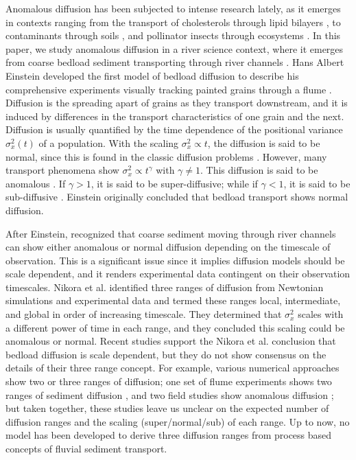 \documentclass[draft,grl]{agujournal2018}
\begin{document}
Anomalous diffusion has been subjected to intense research lately, as it emerges in contexts ranging from the transport of cholesterols through lipid bilayers \citep{Jeon2012,Molina-Garcia2018}, to contaminants through soils \citep{Berkowitz2006,Yang2019}, and pollinator insects through ecosystems \citep{Reynolds2009,Vallaeys2017}.
In this paper, we study anomalous diffusion in a river science context, where it emerges from coarse bedload sediment transporting through river channels \citep{Bradley2017,Martin2012,Ganti2010}.
Hans Albert Einstein developed the first model of bedload diffusion to describe his comprehensive experiments visually tracking painted grains through a flume \citep{Ettema2004,Einstein1937}.
Diffusion is the spreading apart of grains as they transport downstream, and it is induced by differences in the transport characteristics of one grain and the next.
Diffusion is usually quantified by the time dependence of the positional variance $\sigma_x^2(t)$ of a population.
With the scaling $\sigma_x^2 \propto t$, the diffusion is said to be normal, since this is found in the classic diffusion problems \citep[e.g.,][]{Einstein1905,Taylor1920}.
However, many transport phenomena show $\sigma_x^2 \propto t^\gamma$ with $\gamma \neq 1$.
This diffusion is said to be anomalous \citep{Sokolov2012}. 
If $\gamma>1$, it is said to be super-diffusive; while if $\gamma <1$, it is said to be sub-diffusive \citep{Metzler2000}.
Einstein originally concluded that bedload transport shows normal diffusion.

After Einstein, \citet{Nikora2001a,Nikora2002} recognized that coarse sediment moving through river channels can show either anomalous or normal diffusion depending on the timescale of observation.
This is a significant issue since it implies diffusion models should be scale dependent, and it renders experimental data contingent on their observation timescales.
Nikora et al. identified three ranges of diffusion from Newtonian simulations and experimental data and termed these ranges local, intermediate, and global in order of increasing timescale.
They determined that $\sigma_x^2$ scales with a different power of time in each range, and they concluded this scaling could be anomalous or normal.
Recent studies support the Nikora et al. conclusion that bedload diffusion is scale dependent, but they do not show consensus on the details of their three range concept.
For example, various numerical approaches show two \citep[e.g.,][]{Fan2016} or three \citep[e.g.,][]{Bialik2012,Zhang2012} ranges of diffusion; one set of flume experiments shows two ranges of sediment diffusion \citep{Martin2012}, and two field studies show anomalous diffusion \citep{Bradley2017, Phillips2013}; but taken together, these studies leave us unclear on the expected number of diffusion ranges and the scaling (super/normal/sub) of each range.
Up to now, no model has been developed to derive three diffusion ranges from process based concepts of fluvial sediment transport.
\end{document}
